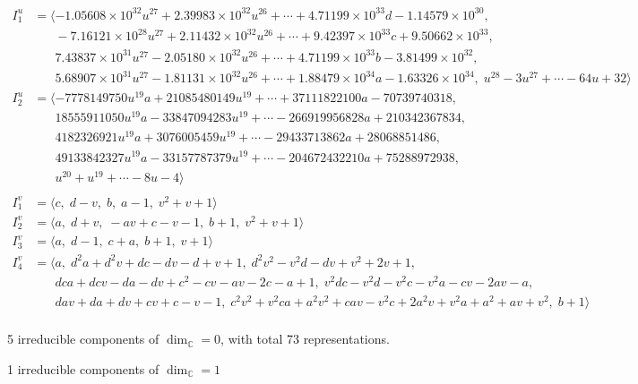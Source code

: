 \documentclass[1p]{elsarticle_modified}
\theoremstyle{definition}
\begin{document}
\begin{align*}
I^u_{1}&=\langle 
-1.05608\times10^{32} u^{27}+2.39983\times10^{32} u^{26}+\cdots+4.71199\times10^{33} d-1.14579\times10^{30},\\
\phantom{I^u_{1}}&\phantom{= \langle  }-7.16121\times10^{28} u^{27}+2.11432\times10^{32} u^{26}+\cdots+9.42397\times10^{33} c+9.50662\times10^{33},\\
\phantom{I^u_{1}}&\phantom{= \langle  }7.43837\times10^{31} u^{27}-2.05180\times10^{32} u^{26}+\cdots+4.71199\times10^{33} b-3.81499\times10^{32},\\
\phantom{I^u_{1}}&\phantom{= \langle  }5.68907\times10^{31} u^{27}-1.81131\times10^{32} u^{26}+\cdots+1.88479\times10^{34} a-1.63326\times10^{34},\;u^{28}-3 u^{27}+\cdots-64 u+32\rangle \\
I^u_{2}&=\langle 
-7778149750 u^{19} a+21085480149 u^{19}+\cdots+37111822100 a-70739740318,\\
\phantom{I^u_{2}}&\phantom{= \langle  }18555911050 u^{19} a-33847094283 u^{19}+\cdots-266919956828 a+210342367834,\\
\phantom{I^u_{2}}&\phantom{= \langle  }4182326921 u^{19} a+3076005459 u^{19}+\cdots-29433713862 a+28068851486,\\
\phantom{I^u_{2}}&\phantom{= \langle  }49133842327 u^{19} a-33157787379 u^{19}+\cdots-204672432210 a+75288972938,\\
\phantom{I^u_{2}}&\phantom{= \langle  }u^{20}+u^{19}+\cdots-8 u-4\rangle \\
\\
I^v_{1}&=\langle 
c,\;d- v,\;b,\;a-1,\;v^2+v+1\rangle \\
I^v_{2}&=\langle 
a,\;d+v,\;- a v+c- v-1,\;b+1,\;v^2+v+1\rangle \\
I^v_{3}&=\langle 
a,\;d-1,\;c+a,\;b+1,\;v+1\rangle \\
I^v_{4}&=\langle 
a,\;d^2 a+d^2 v+d c- d v- d+v+1,\;d^2 v^2- v^2 d- d v+v^2+2 v+1,\\
\phantom{I^v_{4}}&\phantom{= \langle  }d c a+d c v- d a- d v+c^2- c v- a v-2 c- a+1,\;v^2 d c- v^2 d- v^2 c- v^2 a- c v-2 a v- a,\\
\phantom{I^v_{4}}&\phantom{= \langle  }d a v+d a+d v+c v+c- v-1,\;c^2 v^2+v^2 c a+a^2 v^2+c a v- v^2 c+2 a^2 v+v^2 a+a^2+a v+v^2,\;b+1\rangle \\
\end{align*}
\raggedright * 5 irreducible components of $\dim_{\mathbb{C}}=0$, with total 73 representations.\\
\raggedright * 1 irreducible components of $\dim_{\mathbb{C}}=1$ \\
\end{document}
